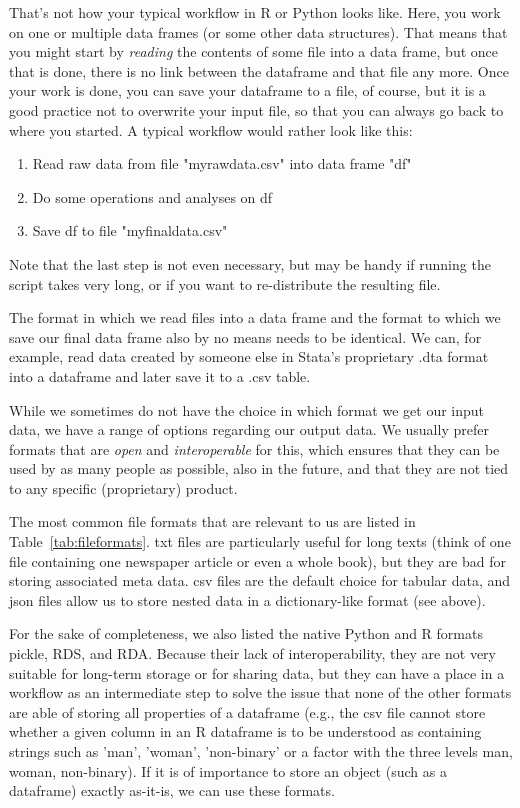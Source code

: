 That's not how your typical workflow in R or Python looks like. Here, you work on one or multiple data frames (or some other data structures). That means that you might start by \emph{reading} the contents of some file into a data frame, but once that is done, there is no link between the dataframe and that file any more. Once your work is done, you can save your dataframe to a file, of course, but it is a good practice not to overwrite your input file, so that you can always go back to where you started. A typical workflow would rather look like this:
\begin{enumerate}
\item Read raw data from file "myrawdata.csv" into data frame "df"
\item Do some operations and analyses on df
\item Save df to file "myfinaldata.csv"
\end{enumerate}
Note that the last step is not even necessary, but may be handy if running the script takes very long, or if you want to re-distribute the resulting file.

The format in which we read files into a data frame and the format to which we save our final data frame also by no means needs to be identical. We can, for example, read data created by someone else in Stata's proprietary .dta format into a dataframe and later save it to a .csv table.

While we sometimes do not have the choice in which format we get our input data, we have a range of options regarding our output data. We usually prefer formats that are \emph{open} and \emph{interoperable} for this, which ensures that they can be used by as many people as possible, also in the future, and that they are not tied to any specific (proprietary) product.

The most common file formats that are relevant to us are listed in Table~\ref{tab:fileformats}. txt files are particularly useful for long texts (think of one file containing one newspaper article or even a whole book), but they are bad for storing associated meta data. csv files are the default choice for tabular data, and json files allow us to store nested data in a dictionary-like format (see above). 

For the sake of completeness, we also listed the native Python and R formats pickle, RDS, and RDA. Because their lack of interoperability, they are not very suitable for long-term storage or for sharing data, but they can have a place in a workflow as an intermediate step to solve the issue that none of the other formats are able of storing all properties of a dataframe (e.g., the csv file cannot store whether a given column in an R dataframe is to be understood as containing strings such as 'man', 'woman', 'non-binary' or a factor with the three levels man, woman, non-binary). If it is of importance to store an object (such as a dataframe) exactly as-it-is, we can use these formats. 

